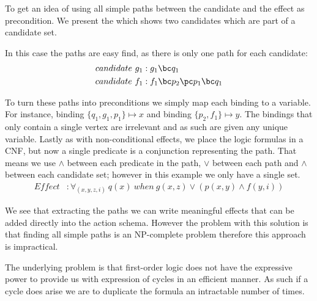 \documentclass[../Master.tex]{subfiles}
\begin{document}
\begin{example}\label{ex:ca:hyp-paths} To get an idea of using all simple paths between the candidate and the effect as precondition. 
	We present the  which shows two candidates which are part of a candidate set.
	
	In this case the paths are easy find, as there is only one path for each candidate:
	\begin{equation*}
		\begin{split}	
			candidate~ g_1 &: g_1 \bc q_1 \\
			candidate~ f_1 &: f_1 \bc p_2 \pc p_1 \bc q_1
		\end{split}
	\end{equation*}
	
	To turn these paths into preconditions we simply map each binding to a variable. For instance, binding $\{q_1,g_1,p_1\} \mapsto x$ and binding $\{p_2,f_1\} \mapsto y$. The bindings that only contain a single vertex are irrelevant and as such are given any unique variable.
	Lastly as with non-conditional effects, we place the logic formulas in a CNF, but now a single predicate is a conjunction representing the path.
	That means we use $\land$ between each predicate in the path, $\lor$ between each path and $\land$ between each candidate set; however in this example we only have a single set.	
	\begin{equation*}
		\begin{split}	
		Effect&: \forall_{(x,y,z,i)} ~q(x)~ when~ g(x,z) \lor ( p(x,y) \land f(y,i) )
		\end{split}
	\end{equation*}
	
	We see that extracting the paths we can write meaningful effects that can be added directly into the action schema.
	However the problem with this solution is that finding all simple paths is an NP-complete problem therefore this approach is impractical. 
	
\end{example}

The underlying problem is that first-order logic does not have the expressive power to provide us with expression of cycles in an efficient manner. As such if a cycle does arise we are to duplicate the formula an intractable number of times.
\end{document}
